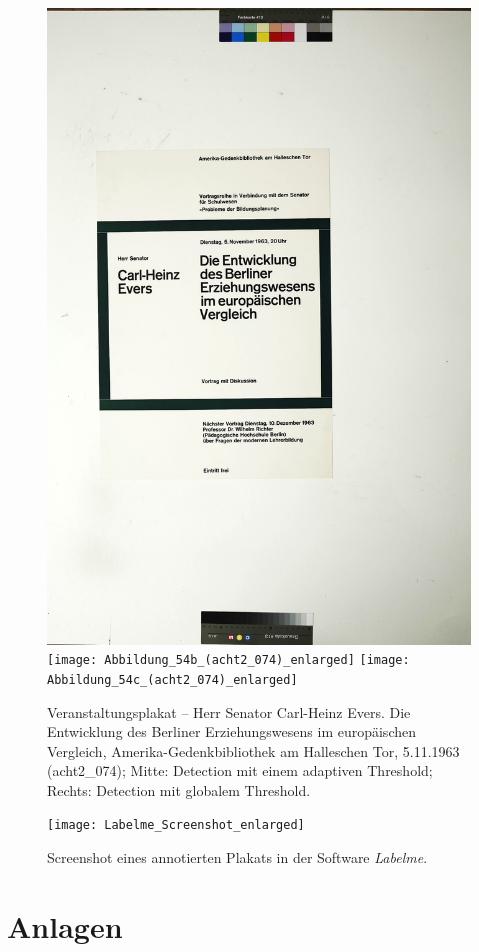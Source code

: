 \documentclass[a4paper,12pt,ngerman]{article}
\begin{document}
\newpage
\begin{landscape}
\begin{figure}[ht]
	\centering
	\includegraphics[height=0.49\linewidth]{Abbildung_54a_(acht2_074)}
	\centering
	\texttt{[image: Abbildung\_54b\_(acht2\_074)\_enlarged]}
	\centering
	\texttt{[image: Abbildung\_54c\_(acht2\_074)\_enlarged]}
	\caption{Veranstaltungsplakat – Herr Senator Carl-Heinz Evers. Die Entwicklung des Berliner Erziehungswesens im europäischen Vergleich, Amerika-Gedenkbibliothek am Halleschen Tor, 5.11.1963 (acht2\_074); Mitte: Detection mit einem adaptiven Threshold; Rechts: Detection mit globalem Threshold.}
\end{figure}
\end{landscape}

\newpage
\begin{figure}[ht]
\texttt{[image: Labelme\_Screenshot\_enlarged]}
\centering
\caption{Screenshot eines annotierten Plakats in der Software \textit{Labelme}.}
\end{figure}

\newpage
\section{Anlagen}
\end{document}
